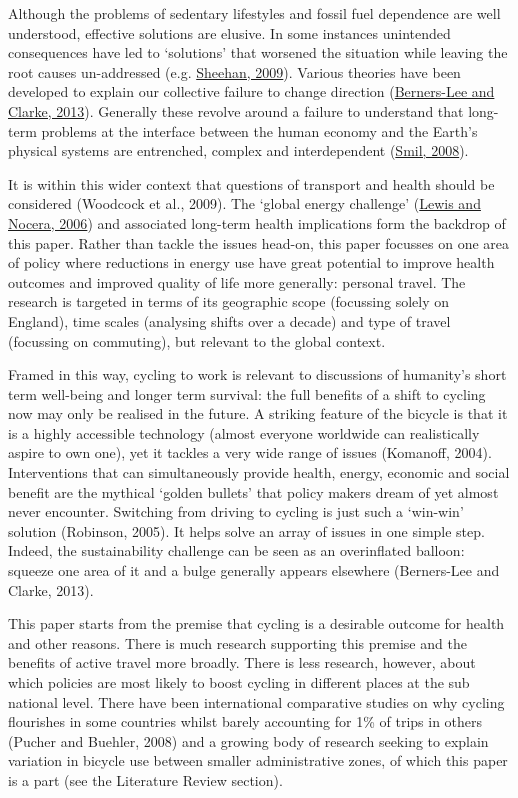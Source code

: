 Although the problems of sedentary lifestyles and fossil fuel dependence
are well understood, effective solutions are elusive. In some instances
unintended consequences have led to `solutions' that worsened the
situation while leaving the root causes un-addressed (e.g.
\href{http://dx.doi.org/10.1016/j.copbio.2009.05.010}{Sheehan, 2009}).
Various theories have been developed to explain our collective failure
to change direction (\href{http://www.burningquestion.info/}{Berners-Lee
and Clarke, 2013}). Generally these revolve around a failure to
understand that long-term problems at the interface between the human
economy and the Earth's physical systems are entrenched, complex and
interdependent
(\href{http://mitpress.mit.edu/books/energy-nature-and-society}{Smil,
2008}).

It is within this wider context that questions of transport and health
should be considered (Woodcock et al., 2009). The `global energy
challenge'
(\href{http://www.pnas.org/cgi/content/long/103/43/15729}{Lewis and
Nocera, 2006}) and associated long-term health implications form the
backdrop of this paper. Rather than tackle the issues head-on, this
paper focusses on one area of policy where reductions in energy use have
great potential to improve health outcomes and improved quality of life
more generally: personal travel. The research is targeted in terms of
its geographic scope (focussing solely on England), time scales
(analysing shifts over a decade) and type of travel (focussing on
commuting), but relevant to the global context.

Framed in this way, cycling to work is relevant to discussions of
humanity's short term well-being and longer term survival: the full
benefits of a shift to cycling now may only be realised in the future. A
striking feature of the bicycle is that it is a highly accessible
technology (almost everyone worldwide can realistically aspire to own
one), yet it tackles a very wide range of issues (Komanoff, 2004).
Interventions that can simultaneously provide health, energy, economic
and social benefit are the mythical `golden bullets' that policy makers
dream of yet almost never encounter. Switching from driving to cycling
is just such a `win-win' solution (Robinson, 2005). It helps solve an
array of issues in one simple step. Indeed, the sustainability challenge
can be seen as an overinflated balloon: squeeze one area of it and a
bulge generally appears elsewhere (Berners-Lee and Clarke, 2013).

This paper starts from the premise that cycling is a desirable outcome
for health and other reasons. There is much research supporting this
premise and the benefits of active travel more broadly. There is less
research, however, about which policies are most likely to boost cycling
in different places at the sub national level. There have been
international comparative studies on why cycling flourishes in some
countries whilst barely accounting for 1\% of trips in others (Pucher
and Buehler, 2008) and a growing body of research seeking to explain
variation in bicycle use between smaller administrative zones, of which
this paper is a part (see the Literature Review section).

